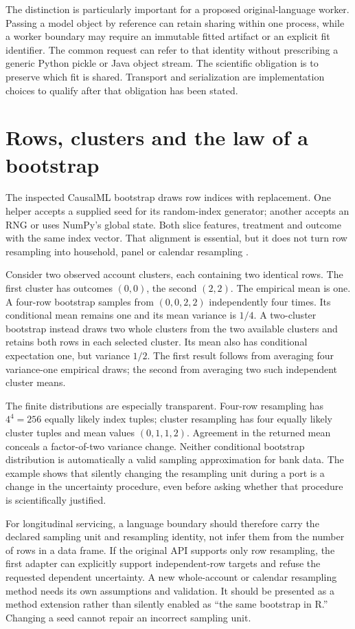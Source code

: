 The distinction is particularly important for a proposed original-language
worker. Passing a model object by reference can retain sharing within one
process, while a worker boundary may require an immutable fitted artifact or
an explicit fit identifier. The common request can refer to that identity
without prescribing a generic Python pickle or Java object stream. The
scientific obligation is to preserve which fit is shared. Transport and
serialization are implementation choices to qualify after that obligation
has been stated.

\section{Rows, clusters and the law of a bootstrap}

The inspected CausalML bootstrap draws row indices with replacement. One
helper accepts a supplied seed for its random-index generator; another accepts
an RNG or uses NumPy's global state. Both slice features, treatment and outcome
with the same index vector. That alignment is essential, but it does not turn
row resampling into household, panel or calendar resampling
\citep{exec14_causalml_primary}.

Consider two observed account clusters, each containing two identical rows.
The first cluster has outcomes $(0,0)$, the second $(2,2)$. The empirical mean
is one. A four-row bootstrap samples from $(0,0,2,2)$ independently four
times. Its conditional mean remains one and its mean variance is $1/4$.
A two-cluster bootstrap instead draws two whole clusters from the two available
clusters and retains both rows in each selected cluster. Its mean also has
conditional expectation one, but variance $1/2$. The first result follows
from averaging four variance-one empirical draws; the second from averaging
two such independent cluster means.

The finite distributions are especially transparent. Four-row resampling has
$4^4=256$ equally likely index tuples; cluster resampling has four equally
likely cluster tuples and mean values $(0,1,1,2)$. Agreement in the returned
mean conceals a factor-of-two variance change. Neither conditional bootstrap
distribution is automatically a valid sampling approximation for bank data.
The example shows that silently changing the resampling unit during a port
is a change in the uncertainty procedure, even before asking whether that
procedure is scientifically justified.

For longitudinal servicing, a language boundary should therefore carry the
declared sampling unit and resampling identity, not infer them from the
number of rows in a data frame. If the original API supports only row
resampling, the first adapter can explicitly support independent-row targets
and refuse the requested dependent uncertainty. A new whole-account or
calendar resampling method needs its own assumptions and validation. It
should be presented as a method extension rather than silently enabled as
``the same bootstrap in R.'' Changing a seed cannot repair an incorrect
sampling unit.

